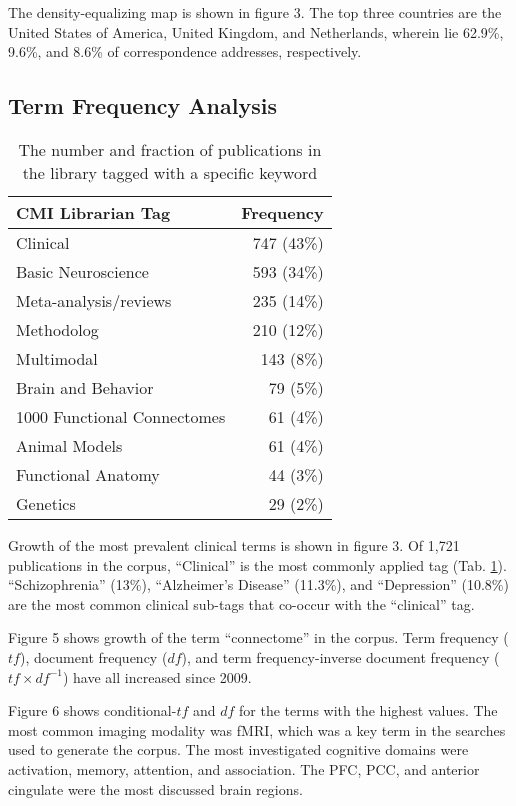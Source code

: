 \documentclass[12pt,3p,review,number]{elsarticle}
\begin{document}
The density-equalizing map is shown in figure 3. The top three countries are the
United States of America, United Kingdom, and Netherlands, wherein lie 62.9\%,
9.6\%, and 8.6\% of correspondence addresses, respectively.


\subsection{Term Frequency Analysis}

\begin{table}[H]
\caption{\label{tagfreqtable} The number and fraction of publications in the
library tagged with a specific keyword}
\begin{center}
\begin{tabular}{|l|r|}
\hline
{\bf CMI Librarian Tag}&{\bf Frequency} \\ \hline \hline
Clinical & 747 (43\%) \\ \hline
Basic Neuroscience&593 (34\%) \\ \hline
Meta-analysis/reviews&235 (14\%) \\ \hline
Methodolog&210 (12\%) \\ \hline
Multimodal&143 (8\%) \\ \hline
Brain and Behavior&79 (5\%) \\ \hline
1000 Functional Connectomes&61 (4\%) \\ \hline
Animal Models&61 (4\%) \\ \hline
Functional Anatomy&44 (3\%) \\ \hline
Genetics&29 (2\%) \\ \hline
\end{tabular}
\end{center}
\end{table}


Growth of the most prevalent clinical terms is shown in figure 3. Of 1,721
publications in the corpus, ``Clinical'' is the most commonly applied tag
(Tab. \ref{tagfreqtable}). ``Schizophrenia'' (13\%), ``Alzheimer's Disease'' (11.3\%),
and ``Depression'' (10.8\%) are the most common clinical sub-tags that co-occur with the
``clinical'' tag.

Figure 5 shows growth of the term ``connectome'' in the corpus. Term frequency
($t\!f$), document frequency ($d\!f$), and term frequency-inverse document frequency
($t\!f \times d\!f^{-1}$) have all increased since 2009.  

Figure 6 shows conditional-$t\!f$ and $d\!f$ for the terms with the highest values. The
most common imaging modality was fMRI, which was a key term in the searches used
to generate the corpus. The most investigated cognitive domains were activation,
memory, attention, and association. The PFC, PCC, and anterior cingulate were
the most discussed brain regions. 
\end{document}
